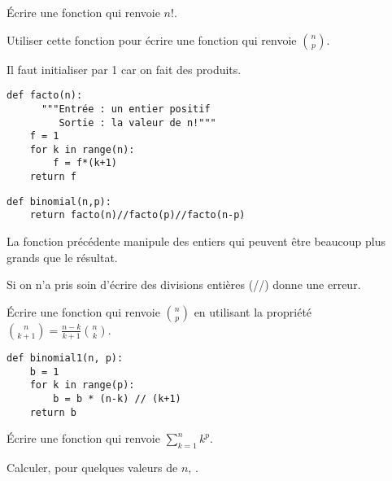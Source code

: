 \begin{Exercise}[title= Factorielle]
Écrire une fonction  qui renvoie $n!$.

Utiliser cette fonction pour écrire une fonction  qui renvoie $\displaystyle\binom np$.
\end{Exercise}
\begin{Answer} Il faut initialiser par 1 car on fait des produits.
\begin{lstlisting}
def facto(n):
	  """Entrée : un entier positif
	     Sortie : la valeur de n!"""
    f = 1
    for k in range(n):
        f = f*(k+1)
    return f
\end{lstlisting}

\begin{lstlisting}
def binomial(n,p):
    return facto(n)//facto(p)//facto(n-p)
\end{lstlisting}

\end{Answer}
\begin{Exercise}[title= {Coefficients binomiaux, bis}]
La fonction précédente manipule des entiers qui peuvent être beaucoup plus grands que le résultat.

Si on n'a pris soin d'écrire des divisions entières (//)  donne une erreur.

Écrire une fonction  qui renvoie $\displaystyle\binom np$ en utilisant la propriété $\displaystyle  \binom n{k+1} = \frac{n-k}{k+1} \binom nk$.
\end{Exercise}
\begin{Answer} 
\begin{lstlisting}
def binomial1(n, p):
    b = 1
    for k in range(p):
        b = b * (n-k) // (k+1)
    return b
\end{lstlisting}
\end{Answer}
\begin{Exercise}[title= Somme de puissances]
Écrire une fonction  qui renvoie $\displaystyle \sum_{k=1}^n k^p$.

Calculer, pour quelques valeurs de $n$, 
.
\end{Exercise}
